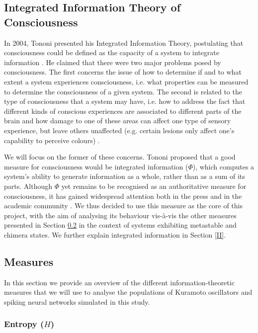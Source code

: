 \documentclass[a4paper,11pt]{article}
\begin{document}
\subsection{Integrated Information Theory of Consciousness}
In 2004, Tononi presented his Integrated Information Theory, postulating that consciousness could be defined as the capacity of a system to integrate information \cite{Tononi2004}. He claimed that there were two major problems posed by consciousness. The first concerns the issue of how to determine if and to what extent a system experiences consciousness, i.e. what properties can be measured to determine the consciousness of a given system. The second is related to the type of consciousness that a system may have, i.e. how to address the fact that different kinds of conscious experiences are associated to different parts of the brain and how damage to one of these areas can affect one type of sensory experience, but leave others unaffected (e.g. certain lesions only affect one's capability to perceive colours) \cite{Tononi2008a}.

We will focus on the former of these concerns. Tononi proposed that a good measure for consciousness would be integrated information ($\Phi$), which computes a system's ability to generate information as a whole, rather than as a sum of its parts. Although $\Phi$ yet remains to be recognised as an authoritative measure for consciousness, it has gained widespread attention both in the press and in the academic community \cite{NewYorkTimes}. We thus decided to use this measure as the core of this project, with the aim of analysing its behaviour vis-\`{a}-vis the other measures presented in Section \ref{Measures} in the context of systems exhibiting metastable and chimera states. We further explain integrated information in Section \ref{II}.

\subsection{Measures}
\label{Measures}
In this section we provide an overview of the different information-theoretic measures that we will use to analyse the populations of Kuramoto oscillators and spiking neural networks simulated in this study.

\subsubsection{Entropy ($H$)}
\label{sec:bg:entropy}
\end{document}
